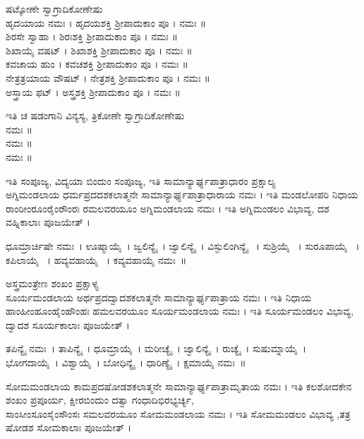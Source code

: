 ಷಟ್ಕೋಣೇ ಸ್ವಾಗ್ರಾದಿಕೋಣೇಷು\\
 ಹೃದಯಾಯ ನಮಃ । ಹೃದಯಶಕ್ತಿ ಶ್ರೀಪಾದುಕಾಂ ಪೂ । ನಮಃ ॥\\
 ಶಿರಸೇ ಸ್ವಾಹಾ । ಶಿರಃಶಕ್ತಿ ಶ್ರೀಪಾದುಕಾಂ ಪೂ । ನಮಃ ॥\\
 ಶಿಖಾಯೈ ವಷಟ್ । ಶಿಖಾಶಕ್ತಿ ಶ್ರೀಪಾದುಕಾಂ ಪೂ । ನಮಃ ॥\\
 ಕವಚಾಯ ಹುಂ । ಕವಚಶಕ್ತಿ ಶ್ರೀಪಾದುಕಾಂ ಪೂ । ನಮಃ ॥\\
 ನೇತ್ರತ್ರಯಾಯ ವೌಷಟ್ । ನೇತ್ರಶಕ್ತಿ ಶ್ರೀಪಾದುಕಾಂ ಪೂ । ನಮಃ ॥\\
 ಅಸ್ತ್ರಾಯ ಫಟ್ । ಅಸ್ತ್ರಶಕ್ತಿ ಶ್ರೀಪಾದುಕಾಂ ಪೂ । ನಮಃ ॥

ಇತಿ ಚ ಷಡಂಗಾನಿ ವಿನ್ಯಸ್ಯ, ತ್ರಿಕೋಣೇ ಸ್ವಾಗ್ರಾದಿಕೋಣೇಷು\\
 ನಮಃ ॥\\
 ನಮಃ ॥\\
 ನಮಃ ॥

ಇತಿ ಸಂಪೂಜ್ಯ, ವಿದ್ಯಯಾ ಬಿಂದುಂ ಸಂಪೂಜ್ಯ,  ಇತಿ ಸಾಮಾನ್ಯಾರ್ಘ್ಯಪಾತ್ರಾಧಾರಂ ಪ್ರಕ್ಷಾಲ್ಯ\\
 ಅಗ್ನಿಮಂಡಲಾಯ ಧರ್ಮಪ್ರದದಶಕಲಾತ್ಮನೇ ಸಾಮಾನ್ಯಾರ್ಘ್ಯಪಾತ್ರಾಧಾರಾಯ ನಮಃ । ಇತಿ ಮಂಡಲೋಪರಿ ನಿಧಾಯ\\
 ರಾಂರೀಂರೂಂರೈಂರೌಂರಃ ರಮಲವರಯೂಂ ಅಗ್ನಿಮಂಡಲಾಯ ನಮಃ । ಇತಿ ಅಗ್ನಿಮಂಡಲಂ ವಿಭಾವ್ಯ, ದಶ ವಹ್ನಿಕಾಲಾಃ ಪೂಜಯೇತ್ ।

 ಧೂಮ್ರಾರ್ಚಿಷೇ   ನಮಃ~।  ಊಷ್ಮಾಯೈ~।  ಜ್ವಲಿನ್ಯೈ~।  ಜ್ವಾಲಿನ್ಯೈ~।  ವಿಸ್ಫುಲಿಂಗಿನ್ಯೈ ~।  ಸುಶ್ರಿಯೈ ~।  ಸುರೂಪಾಯೈ ~।  ಕಪಿಲಾಯೈ ~।  ಹವ್ಯವಹಾಯೈ ~।  ಕವ್ಯವಹಾಯೈ ನಮಃ~॥

ಅಸ್ತ್ರಮಂತ್ರೇಣ ಶಂಖಂ ಪ್ರಕ್ಷಾಳ್ಯ\\
 ಸೂರ್ಯಮಂಡಲಾಯ ಅರ್ಥಪ್ರದದ್ವಾದಶಕಲಾತ್ಮನೇ ಸಾಮಾನ್ಯಾರ್ಘ್ಯಪಾತ್ರಾಯ ನಮಃ । ಇತಿ ನಿಧಾಯ\\
 ಹಾಂಹೀಂಹೂಂಹೈಂಹೌಂಹಃ ಹಮಲವರಯೂಂ ಸೂರ್ಯಮಂಡಲಾಯ ನಮಃ । ಇತಿ ಸೂರ್ಯಮಂಡಲಂ ವಿಭಾವ್ಯ, ದ್ವಾದಶ ಸೂರ್ಯಕಾಲಾಃ ಪೂಜಯೇತ್ ।

 ತಪಿನ್ಯೈ ನಮಃ~।  ತಾಪಿನ್ಯೈ~।  ಧೂಮ್ರಾಯೈ~।  ಮರೀಚ್ಯೈ~।  ಜ್ವಾಲಿನ್ಯೈ~।  ರುಚ್ಯೈ~।  ಸುಷುಮ್ನಾಯೈ~।  ಭೋಗದಾಯೈ~।  ವಿಶ್ವಾಯೈ~।  ಬೋಧಿನ್ಯೈ~।  ಧಾರಿಣ್ಯೈ~।  ಕ್ಷಮಾಯೈ ನಮಃ~॥

 ಸೋಮಮಂಡಲಾಯ ಕಾಮಪ್ರದಷೋಡಶಕಲಾತ್ಮನೇ ಸಾಮಾನ್ಯಾರ್ಘ್ಯಪಾತ್ರಾಮೃತಾಯ ನಮಃ । ಇತಿ ಕಲಶೋದಕೇನ ಶಂಖಂ ಪ್ರಪೂರ್ಯ, ಕ್ಷೀರಬಿಂದುಂ ದತ್ವಾ  ಗಂಧಾದಿಭಿರಭ್ಯರ್ಚ್ಯ,\\
 ಸಾಂಸೀಂಸೂಂಸೈಂಸೌಂಸಃ ಸಮಲವರಯೂಂ ಸೋಮಮಂಡಲಾಯ ನಮಃ । ಇತಿ ಸೋಮಮಂಡಲಂ ವಿಭಾವ್ಯ ,ತತ್ರ ಷೋಡಶ ಸೋಮಕಾಲಾಃ ಪೂಜಯೇತ್ ।

